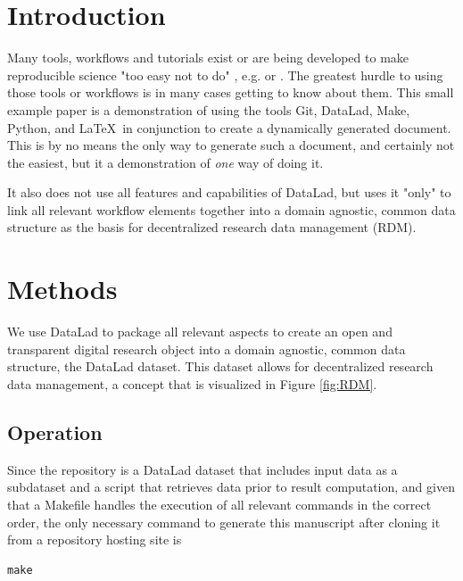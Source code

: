 

\twocolumn
\section*{Introduction}\label{intro}


Many tools, workflows and tutorials exist or are being developed to make
reproducible science "too easy not to do" \citep{the_turing_way}, e.g. \citet{van2020worcs}
or \cite{peikert_brandmaier_2019}.
The greatest hurdle to using those tools or workflows is in many cases getting to
know about them.
This small example paper is a demonstration of using the tools Git, DataLad, Make,
Python, and \LaTeX\ in conjunction to create a dynamically generated document.
This is by no means the only way to generate such a document, and certainly not the
easiest, but it a demonstration of \textit{one} way of doing it.

It also does not use all features and capabilities of DataLad, but uses it "only"
to link all relevant workflow elements together into a domain agnostic, common data
structure as the basis for decentralized research data management (RDM).


\section*{Methods}\label{methods}

We use DataLad to package all relevant aspects to create an open and transparent
digital research object into a domain agnostic, common data structure, the DataLad
dataset.
This dataset allows for decentralized research data management, a concept that is
visualized in Figure \ref{fig:RDM}.
%
\subsection*{Operation}\label{op}

Since the repository is a DataLad dataset that includes input data as a subdataset
and a script that retrieves data prior to result computation, and given that a
Makefile handles the execution of all relevant commands in the correct order, the
only necessary command to generate this manuscript after cloning it from a repository
hosting site is

%
\begin{verbatim}
make
\end{verbatim}
%

